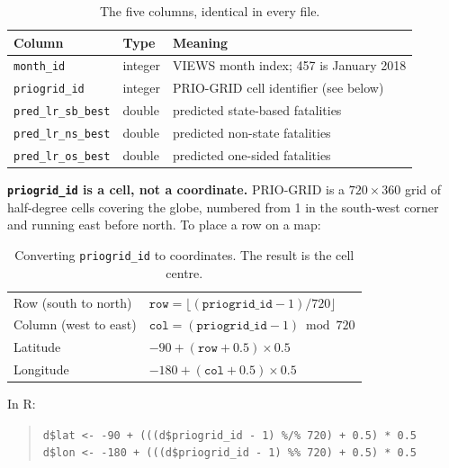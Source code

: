 \begin{table}[h!]
\centering
\small
\renewcommand{\arraystretch}{1.2}
\caption{The five columns, identical in every file.}
\label{tab:columns}
\begin{tabular}{@{}p{4.2cm}p{2.0cm}p{8.0cm}@{}}
\toprule
\textbf{Column} & \textbf{Type} & \textbf{Meaning} \\ \midrule
\texttt{month\_id}           & integer & VIEWS month index; 457 is January 2018 \\
\texttt{priogrid\_id}        & integer & PRIO-GRID cell identifier (see below) \\
\texttt{pred\_lr\_sb\_best}  & double  & predicted state-based fatalities \\
\texttt{pred\_lr\_ns\_best}  & double  & predicted non-state fatalities \\
\texttt{pred\_lr\_os\_best}  & double  & predicted one-sided fatalities \\
\bottomrule
\end{tabular}
\end{table}

\noindent \textbf{\texttt{priogrid\_id} is a cell, not a coordinate.} PRIO-GRID is a $720 \times
360$ grid of half-degree cells covering the globe, numbered from 1 in the south-west corner and
running east before north. To place a row on a map:

\begin{table}[h!]
\centering
\small
\renewcommand{\arraystretch}{1.3}
\caption{Converting \texttt{priogrid\_id} to coordinates. The result is the cell centre.}
\label{tab:priogrid}
\begin{tabular}{@{}p{4.6cm}p{9.4cm}@{}}
\toprule
Row (south to north) & $\texttt{row} = \lfloor (\texttt{priogrid\_id} - 1) / 720 \rfloor$ \\
Column (west to east) & $\texttt{col} = (\texttt{priogrid\_id} - 1) \bmod 720$ \\
Latitude  & $-90 + (\texttt{row} + 0.5) \times 0.5$ \\
Longitude & $-180 + (\texttt{col} + 0.5) \times 0.5$ \\
\bottomrule
\end{tabular}
\end{table}

\noindent In R:

\begin{quote}
\small
\texttt{d\$lat <- -90  + (((d\$priogrid\_id - 1) \%/\% 720) + 0.5) * 0.5} \\
\texttt{d\$lon <- -180 + (((d\$priogrid\_id - 1) \%\%  720) + 0.5) * 0.5}
\end{quote}

